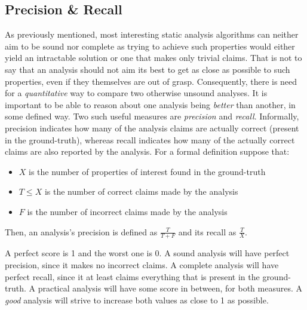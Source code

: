 \subsection{Precision \& Recall}

As previously mentioned, most interesting static analysis algorithms can neither aim to be sound nor complete as trying to achieve such properties would either yield an intractable solution or one that makes only trivial claims. That is not to say that an analysis should not aim its best to get as close as possible to such properties, even if they themselves are out of grasp. Consequently, there is need for a \emph{quantitative} way to compare two otherwise unsound analyses. It is important to be able to reason about one analysis being \emph{better} than another, in some defined way. Two such useful measures are \emph{precision} and \emph{recall}. Informally, precision indicates how many of the analysis claims are actually correct (present in the ground-truth), whereas recall indicates how many of the actually correct claims are also reported by the analysis. For a formal definition suppose that:
\begin{itemize}
    \item $X$ is the number of properties of interest found in the ground-truth
    \item $T \leq X$ is the number of correct claims made by the analysis
    \item $F$ is the number of incorrect claims made by the analysis
\end{itemize}
Then, an analysis's precision is defined as \( \frac{T}{T + F} \) and its recall as \( \frac{T}{X} \).

A perfect score is 1 and the worst one is 0. A sound analysis will have perfect precision, since it makes no incorrect claims. A complete analysis will have perfect recall, since it at least claims everything that is present in the ground-truth. A practical analysis will have some score in between, for both measures. A \emph{good} analysis will strive to increase both values as close to 1 as possible.

